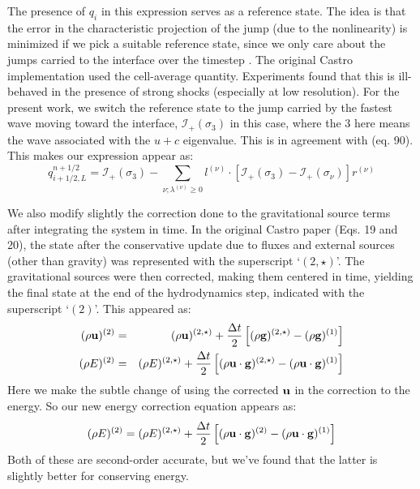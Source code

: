 \documentclass[12pt,preprint]{aastex}
\begin{document}
The presence of $q_i$ in this expression serves as a reference state.
The idea is that the error in the characteristic projection of the
jump (due to the nonlinearity) is minimized if we pick a suitable
reference state, since we only care about the jumps carried to the
interface over the timestep \citep{colellaglaz1985}.  The original
Castro implementation used the cell-average quantity.  Experiments
found that this is ill-behaved in the presence of strong shocks
(especially at low resolution). For the present work, we switch the
reference state to the jump carried by the fastest wave moving toward
the interface, $\mathcal{I}_+(\sigma_3)$ in this case, where the $3$
here means the wave associated with the $u + c$ eigenvalue.  This is
in agreement with \citet{ppmunsplit} (eq. 90).  This makes our
expression appear as:
\begin{equation}
q_{i+1/2,L}^{n+1/2} = \mathcal{I}_+(\sigma_3) -
   \sum_{\nu;\lambda^{(\nu)}\ge 0} l^{(\nu)} \cdot \left [
        \mathcal{I}_+(\sigma_3)  - \mathcal{I}_+(\sigma_\nu)
       \right ] r^{(\nu)}
\end{equation}

We also modify slightly the correction done to the gravitational
source terms after integrating the system in time.  In the original
Castro paper (Eqs. 19 and 20), the state after the conservative update
due to fluxes and external sources (other than gravity) was
represented with the superscript `$(2,\star)$'.  The gravitational
sources were then corrected, making them centered in time, yielding
the final state at the end of the hydrodynamics step, indicated with
the superscript `$(2)$'.  This appeared as:
\begin{eqnarray}
(\rho {\bf u})^{(2)} &=& (\rho {\bf u})^{(2,\star)} +
   \frac{\Delta t}{2} \left [ (\rho {\bf g})^{(2,\star)} - 
                              (\rho {\bf g})^{(1)} \right ]\\
(\rho E)^{(2)} &=& (\rho E)^{(2,\star)} +
   \frac{\Delta t}{2} \left [ (\rho {\bf u\cdot g})^{(2,\star)} - 
                              (\rho {\bf u\cdot g})^{(1)} \right ]
\end{eqnarray}
Here we make the subtle change of using the corrected ${\bf u}$ in the
correction to the energy.  So our new energy correction equation appears as:
\begin{equation}
(\rho E)^{(2)} = (\rho E)^{(2,\star)} +
   \frac{\Delta t}{2} \left [ (\rho {\bf u\cdot g})^{(2)} - 
                              (\rho {\bf u\cdot g})^{(1)} \right ]
\end{equation}
Both of these are second-order accurate, but we've found that the latter
is slightly better for conserving energy.
\end{document}
